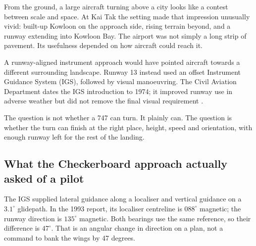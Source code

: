 \label{part:1}
From the ground, a large aircraft turning above a city looks like a contest between scale and space. At Kai Tak the setting made that impression unusually vivid: built-up Kowloon on the approach side, rising terrain beyond, and a runway extending into Kowloon Bay. The airport was not simply a long strip of pavement. Its usefulness depended on how aircraft could reach it.


A runway-aligned instrument approach would have pointed aircraft towards a different surrounding landscape. Runway 13 instead used an offset Instrument Guidance System (IGS), followed by visual manoeuvring. The Civil Aviation Department dates the IGS introduction to 1974; it improved runway use in adverse weather but did not remove the final visual requirement \cite{cadhistory,cad}.

The question is not whether a 747 can turn. It plainly can. The question is whether the turn can finish at the right place, height, speed and orientation, with enough runway left for the rest of the landing.
\clearpage
\subsection*{What the Checkerboard approach actually asked of a pilot}
The IGS supplied lateral guidance along a localiser and vertical guidance on a $3.1^\circ$ glidepath. In the 1993 report, its localiser centreline is $088^\circ$ magnetic; the runway direction is $135^\circ$ magnetic. Both bearings use the same reference, so their difference is $47^\circ$. That is an angular change in direction on a plan, not a command to bank the wings by 47 degrees.


